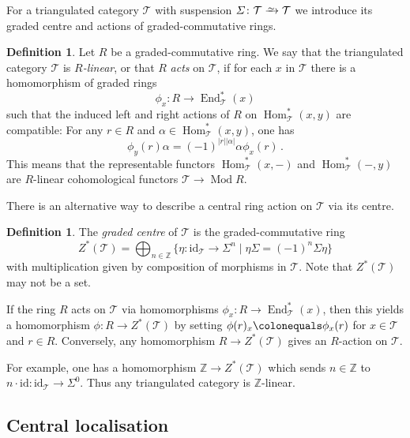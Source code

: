 \documentclass{amsart}[a4]
\theoremstyle{definition}
\newtheorem{definition}[theorem]{Definition}
\theoremstyle{remark}
\numberwithin{equation}{section}
\newcommand{\End}{\operatorname{End}}
\newcommand{\Hom}{\operatorname{Hom}}
\newcommand{\Mod}{\operatorname{Mod}}
\newcommand{\iso}{\xrightarrow{\raisebox{-.6ex}[0ex][0ex]{$\scriptstyle{\sim}$}}}
\newcommand{\lto}{\longrightarrow}
\newcommand{\id}{\mathrm{id}}
\newcommand{\cat}{\mathcal}
\newcommand{\bbZ}{\mathbb Z}
\newcommand{\Si}{\Sigma}
\let\Sigma\varSigma
\begin{document}
For a triangulated category $\cat T$ with suspension $\Si\colon\cat
T\iso\cat T$ we introduce its graded centre and actions of graded-commutative rings.


\begin{definition}
  Let $R$ be a graded-commutative ring. We say that the triangulated category $\cat T$ is
\emph{$R$-linear}, or that $R$ \emph{acts} on $\cat T$, if for each
$x$ in $\cat T$ there is a homomorphism of graded rings
\[ \phi_x\colon R\lto \End_{\cat T}^{*}(x)
\] such that the induced left and right actions of $R$ on $\Hom_{\cat
T}^{*}(x,y)$ are compatible: For any $r\in R$ and
$\alpha\in\Hom^*_{\cat T}(x,y)$, one has
\[ \phi_y(r)\alpha=(-1)^{|r||\alpha|}\alpha\phi_x(r)\,.
\]
This means that the representable functors $\Hom^*_{\cat T}(x,-)$ and
$\Hom^*_{\cat T}(-,y)$ are $R$-linear cohomological functors $\cat
T\to \Mod R$.
\end{definition}

There is an alternative way to describe a central ring action on
$\cat T$ via its centre.

\begin{definition}
  The \emph{graded centre} of $\cat T$ is the  graded-commutative ring 
\[
Z^*(\cat T)=\bigoplus_{n\in\bbZ}\{\eta\colon\id_{\cat T}\to\Si^n\mid\eta\Si=(-1)^n\Si\eta\}
\]
with multiplication given by
composition of morphisms in $\cat T$. Note that $Z^*(\cat T)$ may not
be a set.
\end{definition}

If the ring $R$ acts on $\cat T$ via homomorphisms
$\phi_x\colon R\to \End_{\cat T}^{*}(x)$, then this yields a
homomorphism $\phi\colon R\to Z^*(\cat T)$ by setting
$\phi(r)_x\colonequals\phi_x(r)$ for $x\in\cat T$ and $r\in
R$. Conversely, any homomorphism $R\to Z^*(\cat T)$ gives an
$R$-action on $\cat T$.

For example, one has a homomorphism $\mathbb Z\to Z^*(\cat T)$ which sends $n\in\bbZ$
to $n\cdot \id \colon \id_{\cat T}\to\Si^0$. Thus any triangulated
category is $\mathbb Z$-linear.


\subsection*{Central localisation}
\end{document}
